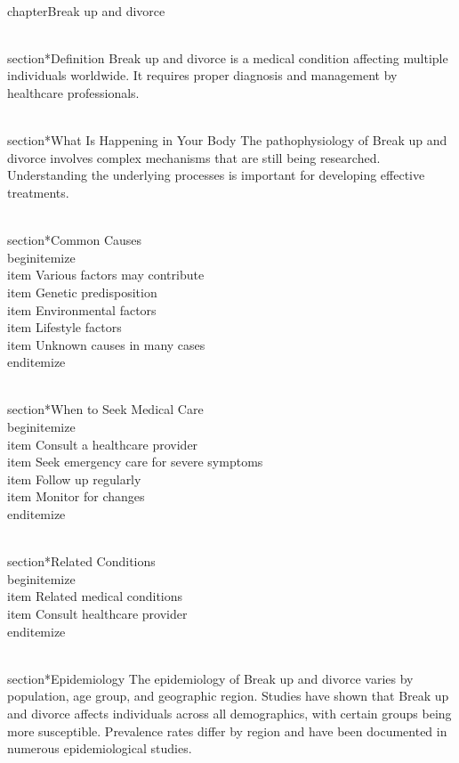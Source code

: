 
\\chapter{Break up and divorce}

\\section*{Definition}
Break up and divorce is a medical condition affecting multiple individuals worldwide. It requires proper diagnosis and management by healthcare professionals.

\\section*{What Is Happening in Your Body}
The pathophysiology of Break up and divorce involves complex mechanisms that are still being researched. Understanding the underlying processes is important for developing effective treatments.

\\section*{Common Causes}
\\begin{itemize}
\\item Various factors may contribute\n  \\item Genetic predisposition\n  \\item Environmental factors\n  \\item Lifestyle factors\n  \\item Unknown causes in many cases
\\end{itemize}

\\section*{When to Seek Medical Care}
\\begin{itemize}
\\item Consult a healthcare provider\n  \\item Seek emergency care for severe symptoms\n  \\item Follow up regularly\n  \\item Monitor for changes
\\end{itemize}

\\section*{Related Conditions}
\\begin{itemize}
\\item Related medical conditions\n  \\item Consult healthcare provider
\\end{itemize}

\\section*{Epidemiology}
The epidemiology of Break up and divorce varies by population, age group, and geographic region. Studies have shown that Break up and divorce affects individuals across all demographics, with certain groups being more susceptible. Prevalence rates differ by region and have been documented in numerous epidemiological studies.

